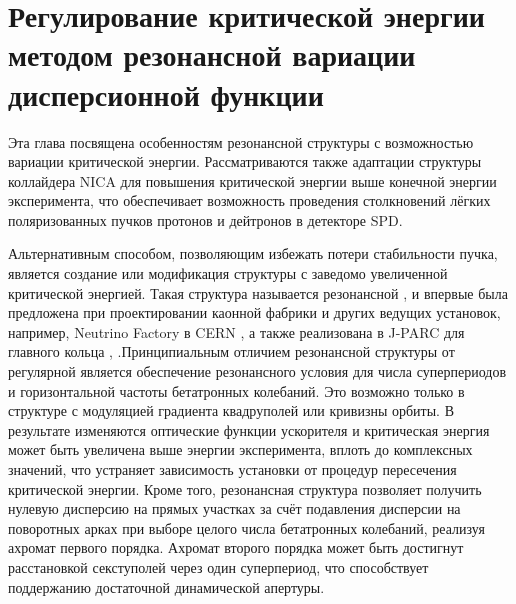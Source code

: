 
	\chapter{Регулирование критической энергии методом резонансной вариации дисперсионной функции}\label{ch:resonant}

\par	Эта глава посвящена особенностям резонансной структуры с возможностью вариации критической энергии. Рассматриваются также адаптации структуры коллайдера NICA для повышения критической энергии выше конечной энергии эксперимента, что обеспечивает возможность проведения столкновений лёгких поляризованных пучков протонов и дейтронов в детекторе SPD.

\par	Альтернативным способом, позволяющим избежать потери стабильности пучка, является создание или модификация структуры с заведомо увеличенной критической энергией. Такая структура называется резонансной \cite{senichev:resonant}, \cite{senichev:construction} и впервые была предложена при проектировании каонной фабрики \cite{kaon_tr} и других ведущих установок, например, Neutrino Factory в CERN \cite{neutrino_tr}, а также реализована в J-PARC для главного кольца \cite{JHP_tr}, \cite{J-PARK_tr}.Принципиальным отличием резонансной структуры от регулярной является обеспечение резонансного условия для числа суперпериодов и горизонтальной частоты бетатронных колебаний. Это возможно только в структуре с модуляцией градиента квадруполей или кривизны орбиты. В результате изменяются оптические функции ускорителя и критическая энергия может быть увеличена выше энергии эксперимента, вплоть до комплексных значений, что устраняет зависимость установки от процедур пересечения критической энергии. Кроме того, резонансная структура позволяет получить нулевую дисперсию на прямых участках за счёт подавления дисперсии на поворотных арках при выборе целого числа бетатронных колебаний, реализуя ахромат первого порядка. Ахромат второго порядка может быть достигнут расстановкой секступолей через один суперпериод, что способствует поддержанию достаточной динамической апертуры.

